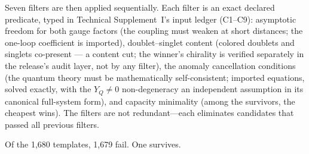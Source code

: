 \documentclass[11pt]{article}
\begin{document}
Seven filters are then applied sequentially.  Each filter is an exact declared predicate, typed in Technical Supplement~I's input ledger (C1--C9): asymptotic freedom for both gauge factors (the coupling must weaken at short distances; the one-loop coefficient is imported), doublet--singlet content (colored doublets and singlets co-present --- a content cut; the winner's chirality is verified separately in the release's audit layer, not by any filter), the anomaly cancellation conditions (the quantum theory must be mathematically self-consistent; imported equations, solved exactly, with the $Y_Q \neq 0$ non-degeneracy an independent assumption in its canonical full-system form), and capacity minimality (among the survivors, the cheapest wins).  The filters are not redundant---each eliminates candidates that passed all previous filters.

Of the 1{,}680 templates, 1{,}679 fail.  One survives.
\end{document}
